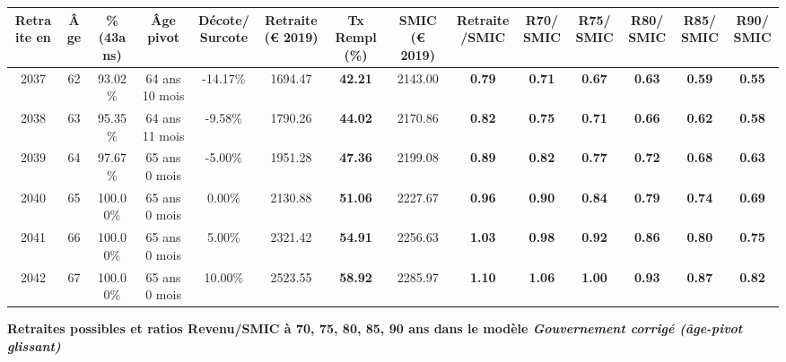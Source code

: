 \begin{adjustbox}{max width=\textwidth} 
\begin{tabular}[htb]{|c|c||c|c|c||c|c||c|c||c|c|c|c|c|} 
\hline 
 Retraite en &  Âge &  \%(43ans) &  Âge pivot &  Décote/Surcote &  Retraite (\euro{} 2019) &  Tx Rempl(\%) &  SMIC (\euro{} 2019) &  Retraite/SMIC &  R70/SMIC &  R75/SMIC &  R80/SMIC &  R85/SMIC &  R90/SMIC \\ 
\hline \hline 
 2037 &  62 &  93.02\% &  64 ans 10 mois &  -14.17\% &  1694.47 &  {\bf 42.21} &  2143.00 &  {\bf {\color{red} 0.79}} &  {\bf {\color{red} 0.71}} &  {\bf {\color{red} 0.67}} &  {\bf {\color{red} 0.63}} &  {\bf {\color{red} 0.59}} &  {\bf {\color{red} 0.55}} \\ 
\hline 
 2038 &  63 &  95.35\% &  64 ans 11 mois &  -9.58\% &  1790.26 &  {\bf 44.02} &  2170.86 &  {\bf {\color{red} 0.82}} &  {\bf {\color{red} 0.75}} &  {\bf {\color{red} 0.71}} &  {\bf {\color{red} 0.66}} &  {\bf {\color{red} 0.62}} &  {\bf {\color{red} 0.58}} \\ 
\hline 
 2039 &  64 &  97.67\% &  65 ans 0 mois &  -5.00\% &  1951.28 &  {\bf 47.36} &  2199.08 &  {\bf {\color{red} 0.89}} &  {\bf {\color{red} 0.82}} &  {\bf {\color{red} 0.77}} &  {\bf {\color{red} 0.72}} &  {\bf {\color{red} 0.68}} &  {\bf {\color{red} 0.63}} \\ 
\hline 
 2040 &  65 &  100.00\% &  65 ans 0 mois &  0.00\% &  2130.88 &  {\bf 51.06} &  2227.67 &  {\bf {\color{red} 0.96}} &  {\bf {\color{red} 0.90}} &  {\bf {\color{red} 0.84}} &  {\bf {\color{red} 0.79}} &  {\bf {\color{red} 0.74}} &  {\bf {\color{red} 0.69}} \\ 
\hline 
 2041 &  66 &  100.00\% &  65 ans 0 mois &  5.00\% &  2321.42 &  {\bf 54.91} &  2256.63 &  {\bf 1.03} &  {\bf {\color{red} 0.98}} &  {\bf {\color{red} 0.92}} &  {\bf {\color{red} 0.86}} &  {\bf {\color{red} 0.80}} &  {\bf {\color{red} 0.75}} \\ 
\hline 
 2042 &  67 &  100.00\% &  65 ans 0 mois &  10.00\% &  2523.55 &  {\bf 58.92} &  2285.97 &  {\bf 1.10} &  {\bf 1.06} &  {\bf {\color{red} 1.00}} &  {\bf {\color{red} 0.93}} &  {\bf {\color{red} 0.87}} &  {\bf {\color{red} 0.82}} \\ 
\hline 
\hline 
\end{tabular} 
\end{adjustbox} 
 
 \vspace{0.1cm} 
{\bf \noindent Retraites possibles et ratios Revenu/SMIC à 70, 75, 80, 85, 90 ans dans le modèle \emph{Gouvernement corrigé (âge-pivot glissant)}}  
 
